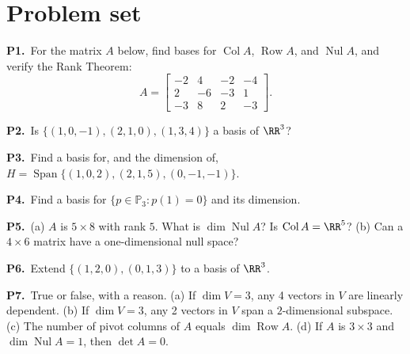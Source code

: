 \documentclass[10pt]{scrartcl}
\DeclareMathOperator{\spn}{Span}\DeclareMathOperator{\Nul}{Nul}\DeclareMathOperator{\Col}{Col}\DeclareMathOperator{\Row}{Row}\DeclareMathOperator{\nullity}{nullity}
\begin{document}
\section{Problem set}
\begin{prob}\textbf{P1.}\ For the matrix $A$ below, find bases for $\Col A$, $\Row A$, and $\Nul A$, and verify the Rank Theorem:
\[
  A = \begin{bmatrix} -2 & 4 & -2 & -4 \\ 2 & -6 & -3 & 1 \\ -3 & 8 & 2 & -3 \end{bmatrix}.
\]
\end{prob}
\begin{prob}\textbf{P2.}\ Is $\{(1,0,-1),(2,1,0),(1,3,4)\}$ a basis of $\RR^3$?
\end{prob}
\begin{prob}\textbf{P3.}\ Find a basis for, and the dimension of, $H=\spn\{(1,0,2),(2,1,5),(0,-1,-1)\}$.
\end{prob}
\begin{prob}\textbf{P4.}\ Find a basis for $\{p\in\mathbb P_3: p(1)=0\}$ and its dimension.
\end{prob}
\begin{prob}\textbf{P5.}\ (a) $A$ is $5\times8$ with rank $5$. What is $\dim\Nul A$? Is $\Col A=\RR^5$? (b) Can a $4\times6$ matrix have a one-dimensional null space?
\end{prob}
\begin{prob}\textbf{P6.}\ Extend $\{(1,2,0),(0,1,3)\}$ to a basis of $\RR^3$.
\end{prob}
\begin{prob}\textbf{P7.}\ True or false, with a reason. (a) If $\dim V=3$, any 4 vectors in $V$ are linearly dependent. (b) If $\dim V=3$, any 2 vectors in $V$ span a $2$-dimensional subspace. (c) The number of pivot columns of $A$ equals $\dim\Row A$. (d) If $A$ is $3\times3$ and $\dim\Nul A=1$, then $\det A=0$.
\end{prob}
\end{document}
